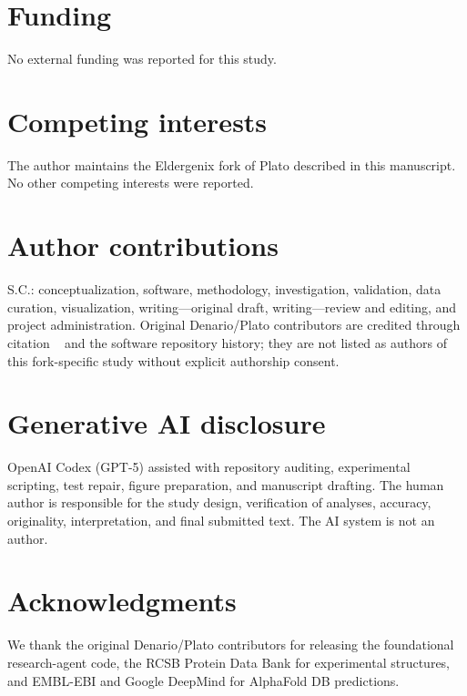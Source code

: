 \documentclass[11pt]{article}
\begin{document}
\section{Funding}

No external funding was reported for this study.

\section{Competing interests}

The author maintains the Eldergenix fork of Plato described in this manuscript. No other competing interests were reported.

\section{Author contributions}

S.C.: conceptualization, software, methodology, investigation, validation, data curation, visualization, writing---original draft, writing---review and editing, and project administration. Original Denario/Plato contributors are credited through citation ~\cite{ref4} and the software repository history; they are not listed as authors of this fork-specific study without explicit authorship consent.

\section{Generative AI disclosure}

OpenAI Codex (GPT-5) assisted with repository auditing, experimental scripting, test repair, figure preparation, and manuscript drafting. The human author is responsible for the study design, verification of analyses, accuracy, originality, interpretation, and final submitted text. The AI system is not an author.

\section{Acknowledgments}

We thank the original Denario/Plato contributors for releasing the foundational research-agent code, the RCSB Protein Data Bank for experimental structures, and EMBL-EBI and Google DeepMind for AlphaFold DB predictions.
\end{document}
